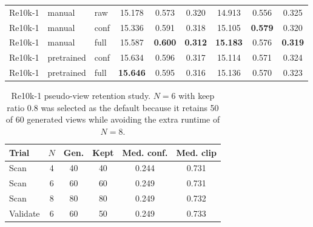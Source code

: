 \documentclass[10pt,twocolumn,letterpaper]{article}
\begin{document}
\begin{table}[t]
{\begin{tabular}{lllcccccc}
\midrule
Re10k-1 & manual & raw  & 15.178 & 0.573 & 0.320 & 14.913 & 0.556 & 0.325 \\
Re10k-1 & manual & conf & 15.336 & 0.591 & 0.318 & 15.105 & \textbf{0.579} & 0.320 \\
Re10k-1 & manual & full & 15.587 & \textbf{0.600} & \textbf{0.312} & \textbf{15.183} & 0.576 & \textbf{0.319} \\
Re10k-1 & pretrained & conf & 15.634 & 0.596 & 0.317 & 15.114 & 0.571 & 0.324 \\
Re10k-1 & pretrained & full & \textbf{15.646} & 0.595 & 0.316 & 15.136 & 0.570 & 0.323 \\
\bottomrule
\end{tabular}
}
\end{table}

\begin{table}[t]
\centering
\caption{Re10k-1 pseudo-view retention study.  $N=6$ with keep ratio $0.8$ was selected as the default because it retains 50 of 60 generated views while avoiding the extra runtime of $N=8$.}
\label{tab:retention}
\begin{tabular}{lccccc}
\toprule
Trial & $N$ & Gen. & Kept & Med. conf. & Med. clip \\
\midrule
Scan & 4 & 40 & 40 & 0.244 & 0.731 \\
Scan & 6 & 60 & 60 & 0.249 & 0.731 \\
Scan & 8 & 80 & 80 & 0.249 & 0.732 \\
Validate & 6 & 60 & 50 & 0.249 & 0.733 \\
\bottomrule
\end{tabular}
\end{table}
\end{document}

